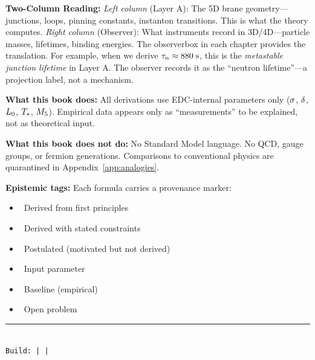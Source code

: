 \documentclass[11pt,a4paper,twoside,openright]{book}
\begin{document}
\textbf{Two-Column Reading:}
\emph{Left column} (Layer A): The 5D brane geometry---junctions, loops, pinning constants,
instanton transitions. This is what the theory computes.
\emph{Right column} (Observer): What instruments record in 3D/4D---particle masses, lifetimes,
binding energies. The observerbox in each chapter provides the translation.
For example, when we derive $\tau_n \approx 880\;\text{s}$, this is the \emph{metastable junction
lifetime} in Layer A. The observer records it as the ``neutron lifetime''---a projection label,
not a mechanism.

\textbf{What this book does:}
All derivations use EDC-internal parameters only ($\sigma$, $\delta$, $L_0$, $T_*$, $M_5$). Empirical data appears only as ``measurements'' to be explained, not as theoretical input.

\textbf{What this book does not do:}
No Standard Model language. No QCD, gauge groups, or fermion generations. Comparisons to conventional physics are quarantined in Appendix~\ref{app:analogies}.

\bigskip

\textbf{Epistemic tags:} Each formula carries a provenance marker:
\begin{itemize}
    \item \tagDer\ Derived from first principles
    \item \tagDc\ Derived with stated constraints
    \item \tagP\ Postulated (motivated but not derived)
    \item \tagI\ Input parameter
    \item \tagBL\ Baseline (empirical)
    \item \tagOpen\ Open problem
\end{itemize}

\vfill
\noindent\rule{\textwidth}{0.4pt}\\[0.5em]
{\small\texttt{Build: \BuildTag{} | \BuildSHA{} | \BuildDate{}}}

\tableofcontents

\listoffigures
{}

\listoftables
{}


\mainmatter

\end{document}
